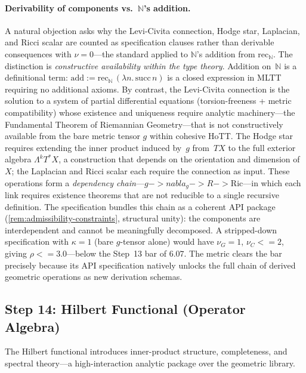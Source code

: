 \documentclass[11pt,a4paper]{article}
\def\leq{<=}%
\def\to{->}%
\def\nabla{nabla}%
\theoremstyle{plain}
\theoremstyle{definition}
\theoremstyle{remark}
\newcommand{\N}{\mathbb{N}}
\begin{document}
\paragraph{Derivability of components vs.\ $\N$'s addition.}
A natural objection asks why the Levi-Civita connection, Hodge star, Laplacian, and Ricci scalar are counted as specification clauses rather than derivable consequences with $\nu = 0$---the standard applied to $\N$'s addition from $\mathrm{rec}_\N$.
The distinction is \emph{constructive availability within the type theory}.
Addition on~$\N$ is a definitional term: $\mathrm{add} := \mathrm{rec}_\N\,(\lambda n.\,\mathrm{succ}\,n)$ is a closed expression in MLTT requiring no additional axioms.
By contrast, the Levi-Civita connection is the solution to a system of partial differential equations (torsion-freeness + metric compatibility) whose existence and uniqueness require analytic machinery---the Fundamental Theorem of Riemannian Geometry---that is not constructively available from the bare metric tensor $g$ within cohesive HoTT.
The Hodge star requires extending the inner product induced by~$g$ from~$TX$ to the full exterior algebra $\Lambda^k T^*X$, a construction that depends on the orientation and dimension of~$X$; the Laplacian and Ricci scalar each require the connection as input.
These operations form a \emph{dependency chain}---$g \to \nabla_g \to R \to \mathrm{Ric}$---in which each link requires existence theorems that are not reducible to a single recursive definition.
The specification bundles this chain as a coherent API package (\cref{rem:admissibility-constraints}, structural unity): the components are interdependent and cannot be meaningfully decomposed.
A stripped-down specification with $\kappa = 1$ (bare $g$-tensor alone) would have $\nu_G = 1$, $\nu_C \leq 2$, giving $\rho \leq 3.0$---below the Step~13 bar of $6.07$.
The metric clears the bar precisely because its API specification natively unlocks the full chain of derived geometric operations as new derivation schemas.

\subsection{Step 14: Hilbert Functional (Operator Algebra)}
\label{app:hilbert-spec}

The Hilbert functional introduces inner-product structure, completeness, and spectral theory---a high-interaction analytic package over the geometric library.
\end{document}
